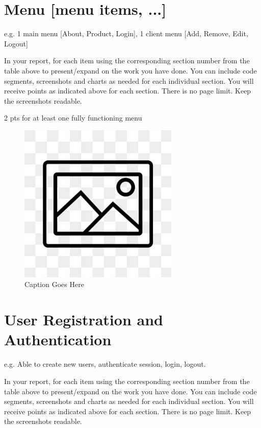 \documentclass[12pt, letterpaper]{article}
\begin{document}
 \newpage

\section{Menu [menu items, ...]}
e.g. 1 main menu [About, Product, Login], 1 client menu [Add, Remove, Edit, Logout]

In your report, for each item using the corresponding section number from the table above to present/expand on the work you have done. You can include code segments, screenshots and charts as needed for each individual section. You will receive points as indicated above for each section. There is no page limit. Keep the screenshots readable.

2 pts for at least one fully functioning menu

\begin{figure}[htbp]
	\centering
	\includegraphics[width=3in]{images/placeholder.jpg}
	\caption{Caption Goes Here}
 \end{figure}

 \newpage

\section{User Registration and Authentication}
e.g. Able to create new users, authenticate session, login, logout.

In your report, for each item using the corresponding section number from the table above to present/expand on the work you have done. You can include code segments, screenshots and charts as needed for each individual section. You will receive points as indicated above for each section. There is no page limit. Keep the screenshots readable.
\end{document}
